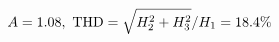\documentclass[preview]{standalone}
\begin{document}
\begin{align*}
\special{dvisvgm:raw <g id='unique000'>}A=1.08,\ \text{THD}=\sqrt{H_2^2+H_3^2}/H_1=18.4\%\special{dvisvgm:raw </g>}
\end{align*}
\end{document}
